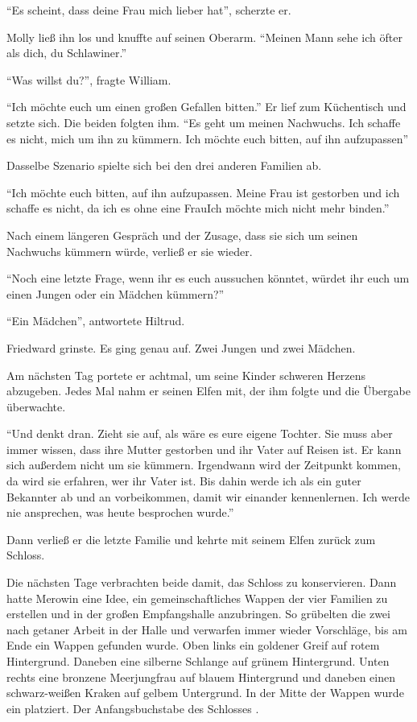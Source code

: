 \enquote{Es scheint, dass deine Frau mich lieber hat}, scherzte er.

Molly ließ ihn los und knuffte auf seinen Oberarm. \enquote{Meinen Mann sehe ich öfter als dich, du Schlawiner.}

\enquote{Was willst du?}, fragte William.

\enquote{Ich möchte euch um einen großen Gefallen bitten.} Er lief zum Küchentisch und setzte sich. Die beiden folgten ihm. \enquote{Es geht um meinen Nachwuchs. Ich schaffe es nicht, mich um ihn zu kümmern. Ich möchte euch bitten, auf ihn aufzupassen\abs}

Dasselbe Szenario spielte sich bei den drei anderen Familien ab.

\enquote{\aabs Ich möchte euch bitten, auf ihn aufzupassen. Meine Frau ist gestorben und ich schaffe es nicht, da ich es ohne eine Frau\abs Ich möchte mich nicht mehr binden.}

Nach einem längeren Gespräch und der Zusage, dass sie sich um seinen Nachwuchs kümmern würde, verließ er sie wieder.

\enquote{Noch eine letzte Frage, wenn ihr es euch aussuchen könntet, würdet ihr euch um einen Jungen oder ein Mädchen kümmern?}

\enquote{Ein Mädchen}, antwortete Hiltrud.

Friedward grinste. Es ging genau auf. Zwei Jungen und zwei Mädchen.

Am nächsten Tag portete er achtmal, um seine Kinder schweren Herzens abzugeben. Jedes Mal nahm er seinen Elfen mit, der ihm folgte und die Übergabe überwachte.

\enquote{Und denkt dran. Zieht sie auf, als wäre es eure eigene Tochter. Sie muss aber immer wissen, dass ihre Mutter gestorben und ihr Vater auf Reisen ist. Er kann sich außerdem nicht um sie kümmern. Irgendwann wird der Zeitpunkt kommen, da wird sie erfahren, wer ihr Vater ist. Bis dahin werde ich als ein guter Bekannter ab und an vorbeikommen, damit wir einander kennenlernen. Ich werde nie ansprechen, was heute besprochen wurde.}

Dann verließ er die letzte Familie und kehrte mit seinem Elfen zurück zum Schloss.

Die nächsten Tage verbrachten beide damit, das Schloss zu konservieren. Dann hatte Merowin eine Idee, ein gemeinschaftliches Wappen der vier Familien zu erstellen und in der großen Empfangshalle anzubringen. So grübelten die zwei nach getaner Arbeit in der Halle und verwarfen immer wieder Vorschläge, bis am Ende ein Wappen gefunden wurde. Oben links ein goldener Greif auf rotem Hintergrund. Daneben eine silberne Schlange auf grünem Hintergrund. Unten rechts eine bronzene Meerjungfrau auf blauem Hintergrund und daneben einen schwarz-weißen Kraken auf gelbem Untergrund. In der Mitte der Wappen wurde ein  platziert. Der Anfangsbuchstabe des Schlosses \gst {}.

